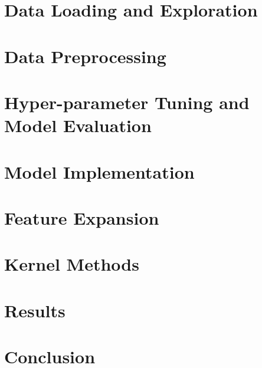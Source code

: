 \documentclass[12pt,twoside]{report}
\begin{document}

    \pagestyle{empty}
    
    

    \pagestyle{plain}
    
    

    
    \pagestyle{fancy}
    
    \chapter{Data Loading and Exploration}
    
    
    \chapter{Data Preprocessing}
    
    
    \chapter{Hyper-parameter Tuning and Model Evaluation}
    
    
    \chapter{Model Implementation}
    

    \chapter{Feature Expansion}
    

    \chapter{Kernel Methods}
    

    \chapter{Results}
    
    
    \chapter{Conclusion}
    


    \pagestyle{plain}
    \printbibliography

    \appendix
    
\end{document}
